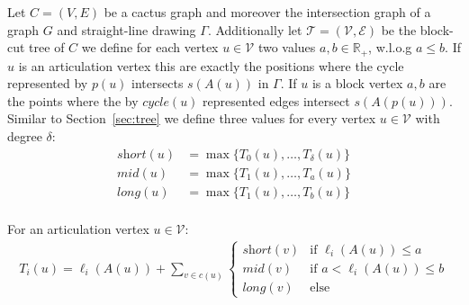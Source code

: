 \documentclass[a4paper,english,numberwithinsect]{eurocg18}
\newcommand{\sollong}{\ensuremath{\textit{long}}\xspace}
\newcommand{\solmid}{\ensuremath{\textit{mid}}\xspace}
\newcommand{\solshort}{\ensuremath{\textit{short}}\xspace}
\begin{document}
Let $ C = (V,E) $ be a cactus graph and moreover the intersection graph of a graph $ G $ and straight-line drawing $ \Gamma $. Additionally let $ \mathcal T = (\mathcal V, \mathcal E) $ be the block-cut tree of $ C $ we define for each vertex $ u \in \mathcal V $ two values $ a,b \in \mathbb{R}_+ $, w.l.o.g $ a \leq b $. If $ u $ is an articulation vertex this are exactly the positions where the cycle represented by $ p(u) $ intersects $ s(A(u)) $ in $ \Gamma $. If $ u $ is a block vertex $ a,b $ are the points where the by $ \textit{cycle}(u) $ represented edges intersect $ s(A(p(u))) $. Similar to Section~\ref{sec:tree} we define three values for every vertex $ u \in \mathcal V $ with degree $ \delta $:
\begin{align*}
	\solshort(u) &= \max\{T_0(u),\dots,T_\delta(u)\}\\
	\solmid(u) &= \max\{T_1(u),\dots,T_{a}(u)\}\\
	\sollong(u) &= \max\{T_1(u),\dots,T_{b}(u)\}\\
\end{align*}

For an articulation vertex $ u \in \mathcal V $:
\begin{align}
\label{rec:cactus_block}
T_i(u) = \ell_i(A(u)) + \sum_{v \in c(u)}
\begin{cases}
\solshort(v) & \text{if } \ell_i(A(u)) \leq a \\
\solmid(v) & \text{if } a < \ell_i(A(u)) \leq b \\
\sollong(v) & \text{else}
\end{cases}
\end{align}
\end{document}
